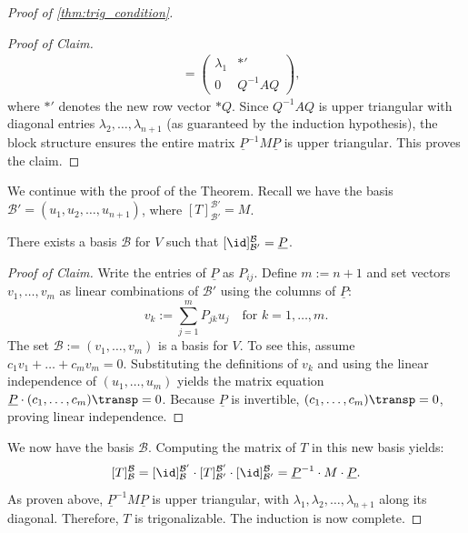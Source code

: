 \begin{proof}[Proof of \cref{thm:trig_condition}]
\begin{proof}[Proof of Claim]
\begin{align*}
      &= \left(\begin{array}{c|c} \lambda_1 & *' \\ \hline 0 & Q^{-1}AQ \end{array}\right),
    \end{align*}
    where $*'$ denotes the new row vector $*Q$.
    Since $Q^{-1}AQ$ is upper triangular with diagonal entries $\lambda_2, \dots, \lambda_{n+1}$ (as guaranteed by the induction hypothesis), the block structure ensures the entire matrix $\underline{P}^{-1}M\underline{P}$ is upper triangular. This proves the claim.
  \end{proof}

  We continue with the proof of the Theorem. Recall we have the basis $\mathcal{B}' = (u_1, u_2, \dots, u_{n+1})$, where $[T]_{\mathcal{B}'}^{\mathcal{B}'} = M$.

  \begin{claim*}\label{claim:trig_basis_exists}
    There exists a basis $\mathcal{B}$ for $V$ such that $[\id]_{\mathcal{B}'}^{\mathcal{B}} = \underline{P}$.
  \end{claim*}

  \begin{proof}[Proof of Claim]
    Write the entries of $\underline{P}$ as $P_{ij}$. Define $m := n+1$ and set vectors $v_1, \dots, v_m$ as linear combinations of $\mathcal{B}'$ using the columns of $\underline{P}$:
    \[ v_k := \sum_{j=1}^m P_{jk} u_j \quad \text{for } k = 1, \dots, m. \]
    The set $\mathcal{B} := (v_1, \dots, v_m)$ is a basis for $V$.
    To see this, assume $c_1 v_1 + \dots + c_m v_m = 0$. Substituting the definitions of $v_k$ and using the linear independence of $(u_1, \dots, u_m)$ yields the matrix equation $\underline{P} \cdot (c_1, \dots, c_m)\transp = 0$.
    Because $\underline{P}$ is invertible, $(c_1, \dots, c_m)\transp = 0$, proving linear independence.
  \end{proof}

  We now have the basis $\mathcal{B}$. Computing the matrix of $T$ in this new basis yields:
  \begin{equation} \label{eq:final_trigonal_matrix}
    [T]_{\mathcal{B}}^{\mathcal{B}} = [\id]_{\mathcal{B}}^{\mathcal{B}'} \cdot [T]_{\mathcal{B}'}^{\mathcal{B}'} \cdot [\id]_{\mathcal{B}'}^{\mathcal{B}} = \underline{P}^{-1} \cdot M \cdot \underline{P}.
  \end{equation}
  As proven above, $\underline{P}^{-1} M \underline{P}$ is upper triangular, with $\lambda_1, \lambda_2, \dots, \lambda_{n+1}$ along its diagonal. Therefore, $T$ is trigonalizable. The induction is now complete.
\end{proof}

